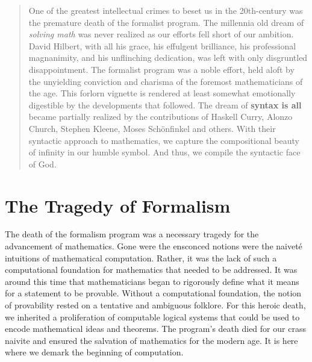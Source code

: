 \maketitle
\pagebreak

\begin{abstract}
    One of the greatest intellectual crimes to beset us in the 20th-century was
    the premature death of the formalist program. The millennia old dream of
    \textit{solving math} was never realized as our efforts fell short of our
    ambition. David Hilbert, with all his grace, his effulgent brilliance, his
    professional magnanimity, and his unflinching dedication, was left with only
    disgruntled disappointment. The formalist program was a noble effort, held
    aloft by the unyielding conviction and charisma of the foremost
    mathematicians of the age. This forlorn vignette is rendered at least
    somewhat emotionally digestible by the developments that followed. The dream
    of \textbf{syntax is all} became partially realized by the contributions of Haskell
    Curry, Alonzo Church, Stephen Kleene, Moses Schönfinkel and others. With
    their syntactic approach to mathematics, we capture the compositional beauty
    of infinity in our humble symbol. And thus, we compile the syntactic face of God.
\end{abstract}
\pagebreak
\tableofcontents
\pagebreak

\section{The Tragedy of Formalism}
The death of the formalism program was a necessary tragedy for the advancement
of mathematics. Gone were the ensconced notions were the naiveté intuitions of
mathematical computation. Rather, it was the lack of such a computational
foundation for mathematics that needed to be addressed. It was around this time
that mathematicians began to rigorously define what it means for a statement to
be provable. Without a computational foundation, the notion of provability
rested on a tentative and ambiguous folklore. For this heroic death, we
inherited a proliferation of computable logical systems that could be used to
encode mathematical ideas and theorems. The program's death died for our crass
naivite and ensured the salvation of mathematics for the modern age. It is here
where we demark the beginning of computation.

